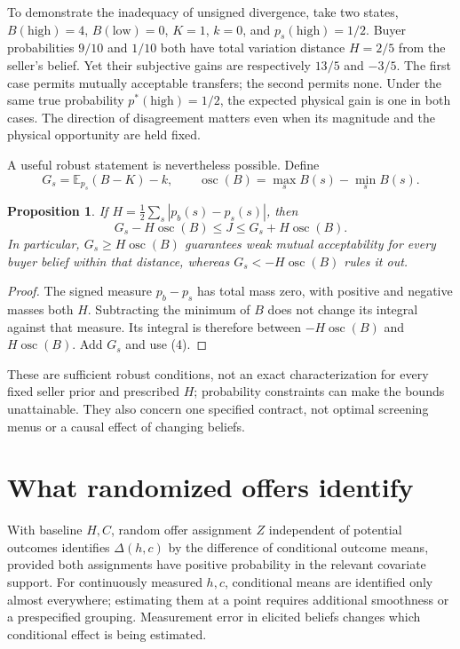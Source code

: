 \documentclass[11pt]{article}
\newtheorem{proposition}{Proposition}
\newcommand{\E}{\mathbb E}
\begin{document}
To demonstrate the inadequacy of unsigned divergence, take two states, $B(\mathrm{high})=4$, $B(\mathrm{low})=0$, $K=1$, $k=0$, and $p_s(\mathrm{high})=1/2$. Buyer probabilities $9/10$ and $1/10$ both have total variation distance $H=2/5$ from the seller's belief. Yet their subjective gains are respectively $13/5$ and $-3/5$. The first case permits mutually acceptable transfers; the second permits none. Under the same true probability $p^*(\mathrm{high})=1/2$, the expected physical gain is one in both cases. The direction of disagreement matters even when its magnitude and the physical opportunity are held fixed.

A useful robust statement is nevertheless possible. Define
\[
 G_s=\E_{p_s}(B-K)-k,\qquad
 \operatorname{osc}(B)=\max_s B(s)-\min_s B(s).
\]
\begin{proposition}
If $H=\tfrac12\sum_s|p_b(s)-p_s(s)|$, then
\[
 G_s-H\operatorname{osc}(B)\leq J\leq G_s+H\operatorname{osc}(B). \tag{5}
\]
In particular, $G_s\geq H\operatorname{osc}(B)$ guarantees weak mutual acceptability for every buyer belief within that distance, whereas $G_s<-H\operatorname{osc}(B)$ rules it out.
\end{proposition}
\begin{proof}
The signed measure $p_b-p_s$ has total mass zero, with positive and negative masses both $H$. Subtracting the minimum of $B$ does not change its integral against that measure. Its integral is therefore between $-H\operatorname{osc}(B)$ and $H\operatorname{osc}(B)$. Add $G_s$ and use (4).
\end{proof}
These are sufficient robust conditions, not an exact characterization for every fixed seller prior and prescribed $H$; probability constraints can make the bounds unattainable. They also concern one specified contract, not optimal screening menus or a causal effect of changing beliefs.

\section*{What randomized offers identify}
With baseline $H,C$, random offer assignment $Z$ independent of potential outcomes identifies $\Delta(h,c)$ by the difference of conditional outcome means, provided both assignments have positive probability in the relevant covariate support. For continuously measured $h,c$, conditional means are identified only almost everywhere; estimating them at a point requires additional smoothness or a prespecified grouping. Measurement error in elicited beliefs changes which conditional effect is being estimated.
\end{document}
